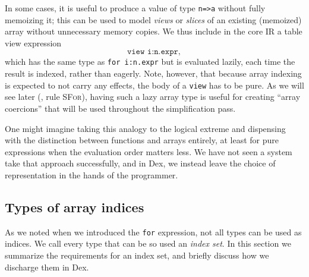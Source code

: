 \documentclass[acmsmall,screen,nonacm]{acmart}
\newcommand{\ttt}[1]{\texttt{#1}}
\newcommand{\tsc}[1]{\textsc{#1}}
\begin{document}
In some cases, it is useful to produce a value of type \verb|n=>a| without fully memoizing it; this can be used to model \emph{views} or \emph{slices} of an existing (memoized) array without unnecessary memory copies. We thus include in the core IR a table view expression
$$ \ttt{view i:n.expr}, $$
which has the same type as \verb|for i:n.expr| but is evaluated lazily, each time the result is indexed, rather than eagerly.
Note, however, that because array indexing is expected to not carry any effects, the body of a \texttt{view} has to be pure.
As we will see later (, rule \tsc{SFor}), having such a lazy array type is useful for creating ``array coercions'' that will be used throughout the simplification pass.

One might imagine taking this analogy to the logical extreme and dispensing with the distinction between functions and arrays entirely, at least for pure expressions when the evaluation order matters less.
We have not seen a system take that approach successfully, and in Dex, we instead leave the choice of representation in the hands of the programmer.

\subsection{Types of array indices}
\label{sec:index-sets}

As we noted when we introduced the \texttt{for} expression, not all types can be used as indices.
We call every type that can be so used an \emph{index set}.
In this section we summarize the requirements for an index set, and briefly discuss how we discharge them in Dex.
\end{document}
